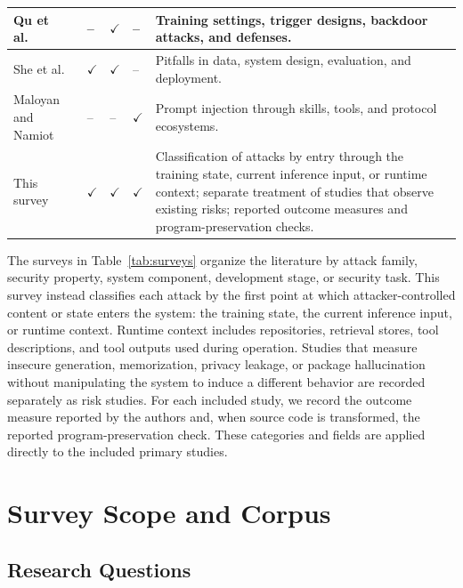 \documentclass[acmsmall,screen,review]{acmart}
\begin{document}
{\begin{longtable}{@{}L{2.00cm}C{2cm}C{1.05cm}C{1.15cm}L{7.00cm}@{}}
Qu et al.~\cite{qu2025backdoorsurvey} &
-- &
\(\checkmark\) &
-- &
Training settings, trigger designs, backdoor attacks, and defenses. \\
\midrule

She et al.~\cite{she2026pitfalls} &
\(\checkmark\) &
\(\checkmark\) &
-- &
Pitfalls in data, system design, evaluation, and deployment. \\
\midrule

Maloyan and Namiot~\cite{maloyan2026promptinjection} &
-- &
-- &
\(\checkmark\) &
Prompt injection through skills, tools, and protocol ecosystems. \\
\midrule

This survey &
\(\checkmark\) &
\(\checkmark\) &
\(\checkmark\) &
Classification of attacks by entry through the training state, current inference input, or runtime context; separate treatment of studies that observe existing risks; reported outcome measures and program-preservation checks. \\

\end{longtable}
}

The surveys in Table~\ref{tab:surveys} organize the literature by attack family, security property, system component, development stage, or security task. This survey instead classifies each attack by the first point at which attacker-controlled content or state enters the system: the training state, the current inference input, or runtime context. Runtime context includes repositories, retrieval stores, tool descriptions, and tool outputs used during operation. Studies that measure insecure generation, memorization, privacy leakage, or package hallucination without manipulating the system to induce a different behavior are recorded separately as risk studies. For each included study, we record the outcome measure reported by the authors and, when source code is transformed, the reported program-preservation check. These categories and fields are applied directly to the included primary studies.



\section{Survey Scope and Corpus} \label{sec:method}

\subsection{Research Questions}
\end{document}

